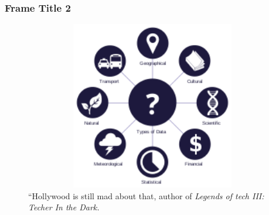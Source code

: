 \begin{frame}
\frametitle{Frame Title 2}
\begin{figure}
    \centering
    \includegraphics[width=400pt,height=210pt]{figures/fig1.png}
    \caption{``Hollywood is still mad about that, author of \emph{Legends of tech III: Techer In the Dark.}}
    \label{fig:hollywood}
\end{figure}

\end{frame}